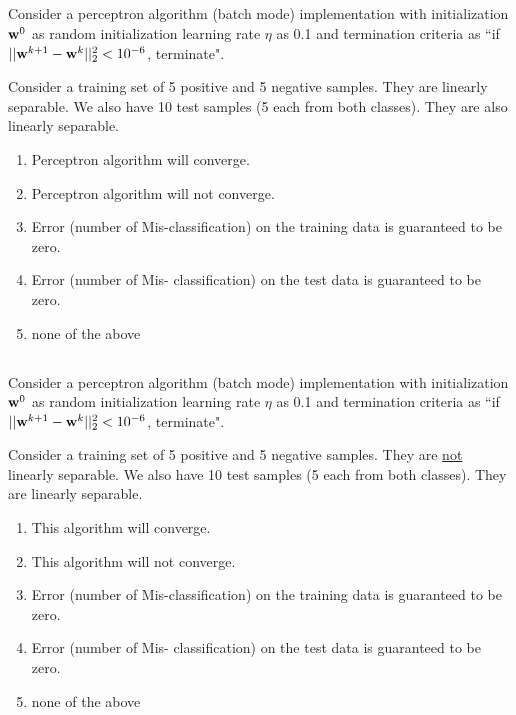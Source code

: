 \begin{frame}
\section{}
  Consider a perceptron algorithm (batch mode) implementation with initialization ${\bf w}^0$ as random initialization learning rate $\eta $ as 0.1 and termination criteria as ``if $||{\bf w}^{k+1} - {\bf w}^k||_2^2 <10^{-6}$, terminate".

  Consider a training set of 5 positive and 5 negative samples. They are linearly separable. We also have 10 test samples (5 each from both classes). They are also linearly separable.
    \begin{enumerate}[label=(\Alph*)]
      \item Perceptron algorithm will converge.   %
      \item Perceptron algorithm will not converge.
      \item Error (number of Mis-classification) on the training data is guaranteed to be zero.   %
      \item Error (number of Mis- classification) on the test data is guaranteed to be zero.
      \item none of the above    %
    \end{enumerate}
\end{frame}

\begin{frame}
\section{}
  Consider a perceptron algorithm (batch mode) implementation with initialization ${\bf w}^0$ as random initialization learning rate $\eta $ as 0.1 and  termination criteria as ``if $||{\bf w}^{k+1} - {\bf w}^k||_2^2 <10^{-6}$, terminate".

  Consider a training set of 5 positive and 5 negative samples. They are \underline{not} linearly separable. We also have 10 test samples (5 each from both classes). They are  linearly separable.
     \begin{enumerate}[label=(\Alph*)]
      \item This algorithm will converge.
      \item This algorithm will not converge.   %
      \item Error (number of Mis-classification) on the training data is guaranteed to be zero.
      \item Error (number of Mis- classification) on the test data is guaranteed to be zero.
      \item none of the above   %
     \end{enumerate}
\end{frame}


